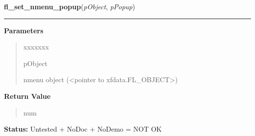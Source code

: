 \hspace{.8\funcindent}\begin{boxedminipage}{\funcwidth}

    \raggedright \textbf{fl\_set\_nmenu\_popup}(\textit{pObject}, \textit{pPopup})

    \vspace{-1.5ex}

    \rule{\textwidth}{0.5\fboxrule}
\setlength{\parskip}{2ex}
\setlength{\parskip}{1ex}
      \textbf{Parameters}
      \vspace{-1ex}

      \begin{quote}
        \begin{Ventry}{xxxxxxx}

          \item[pObject]

          nmenu object ({\textless}pointer to 
          xfdata.FL\_OBJECT{\textgreater})

        \end{Ventry}

      \end{quote}

      \textbf{Return Value}
    \vspace{-1ex}

      \begin{quote}
      num

      \end{quote}

\textbf{Status:} Untested + NoDoc + NoDemo = NOT OK



    \end{boxedminipage}

    \label{xformslib:library:fl_get_nmenu_item}

    \vspace{0.5ex}

